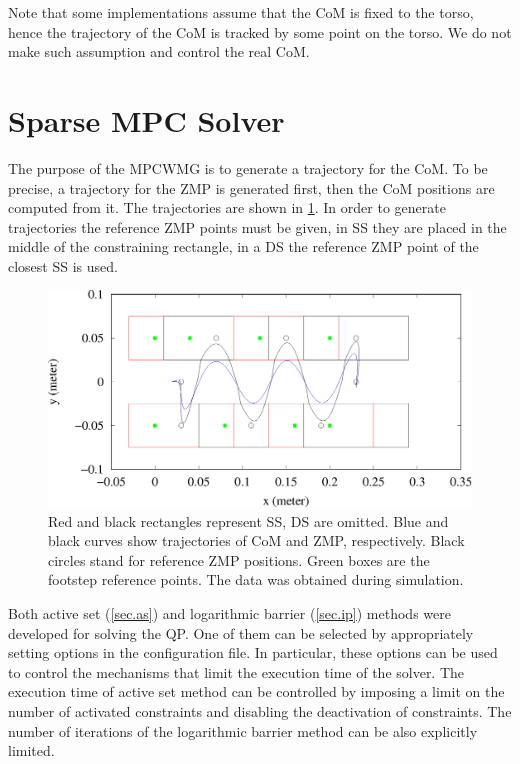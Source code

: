 Note that some implementations \cite{NaoWalk} assume that the \ac{CoM} is fixed to 
the torso, hence the trajectory of the \ac{CoM} is tracked by some point on the
torso. We do not make such assumption and control the real \ac{CoM}.



\section{Sparse MPC Solver}
The purpose of the \ac{MPCWMG} is to generate a trajectory for the \ac{CoM}. To be
precise, a trajectory for the \ac{ZMP} is generated first, then the \ac{CoM}
positions are computed from it. The trajectories are shown in \cref{fig.footsteps}.
In order to generate trajectories the reference \ac{ZMP} points must be given,
in \ac{SS} they are placed in the middle of the constraining rectangle, in a \ac{DS} 
the reference \ac{ZMP} point of the closest \ac{SS} is used.

\begin{figure}[ht]
    \centerline{%
    \includegraphics[scale=0.5]{Figures/sim_nodist_as.eps}}
    \caption[Footsteps and trajectories of {\bf CoM} and {\bf ZMP}]{Red and black rectangles
    represent \ac{SS}, \ac{DS} are omitted. Blue and black curves show trajectories 
    of \ac{CoM} and \ac{ZMP}, respectively. Black circles stand for reference 
    \ac{ZMP} positions. Green boxes are the footstep reference points. The data was obtained
    during simulation.}
    \label{fig.footsteps}
\end{figure}

Both active set (\cref{sec.as}) and logarithmic barrier (\cref{sec.ip}) 
methods were developed for solving the \ac{QP}. One of them can be 
selected by appropriately setting options in the configuration file. In particular,
these options can be used to control the mechanisms that limit the execution
time of the solver. The execution time of active set method can be controlled 
by imposing a limit on the number of activated constraints and disabling the 
deactivation of constraints. The number of iterations of the logarithmic barrier
method can be also explicitly limited.


